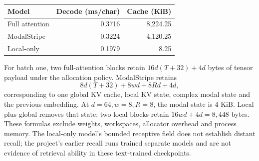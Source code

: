 \documentclass[11pt,letterpaper]{article}
\begin{document}
\begin{center}\begin{minipage}{\textwidth}\centering\small
{}

\begin{tabular}{lrr}\toprule
Model & Decode (ms/char) & Cache (KiB)\\\midrule
Full attention & 0.3716 & 8,224.25 \\
ModalStripe & 0.3224 & 4,120.25 \\
Local-only & 0.1979 & 8.25 \\
\bottomrule\end{tabular}


\end{minipage}\end{center}

For batch one, two full-attention blocks retain $16d(T+32)+4d$ bytes of tensor payload under the allocation policy. ModalStripe retains
\[
 8d(T+32)+8wd+8Rd+4d,
\]
corresponding to one global KV cache, local KV state, complex modal state and the previous embedding. At $d=64,w=8,R=8$, the modal state is 4 KiB. Local plus global removes that state; two local blocks retain $16wd+4d=8,448$ bytes. These formulas exclude weights, workspaces, allocator overhead and process memory. The local-only model's bounded receptive field does not establish distant recall; the project's earlier recall runs trained separate models and are not evidence of retrieval ability in these text-trained checkpoints.
\end{document}
